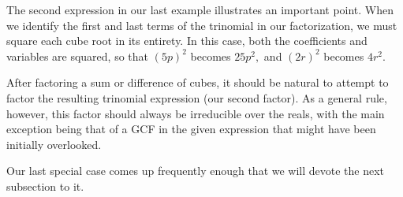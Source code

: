 \documentclass[12pt]{book}
\theoremstyle{definition}
\begin{document}
The second expression in our last example illustrates an important point.  When we identify the first and last terms of the trinomial in our factorization, we must square each cube root in its entirety.  In this case, both the coefficients and variables are squared, so that $\left(5p\right)^2$ becomes $25p^2,$ and $\left(2r\right)^2$ becomes $4r^2$.
\par
After factoring a sum or difference of cubes, it should be natural to attempt to factor the resulting trinomial expression (our second factor). As a general rule, however, this factor should always be irreducible over the reals, with the main exception being that of a GCF in the given expression that might have been initially overlooked.
\par
Our last special case comes up frequently enough that we will devote the next subsection to it.
\end{document}
